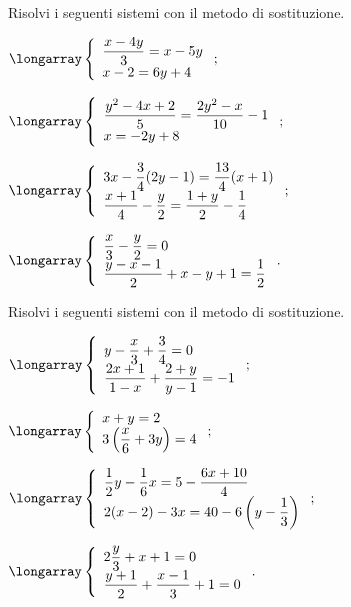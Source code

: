 \begin{esercizio}[\Ast]
 \label{ese:19.11}
Risolvi i seguenti sistemi con il metodo di sostituzione.
 \begin{multicols}{2}
 \begin{enumeratea}
 \item $\longarray\left\{\begin{array}{l}\dfrac{x-4y}{3}=x-5y\\x-2=6y+4 \end{array}\right.;$
\item $\longarray\left\{\begin{array}{l}\dfrac{y^{2}-4x+2}{5}=\dfrac{2y^{2}-x}{10}-1\\x=-2y+8\end{array}\right.;$
\item $\longarray\left\{\begin{array}{l}3x-\dfrac{3}{4}(2y-1)=\dfrac{13}{4}(x+1)\\\dfrac{x+1}{4}-\dfrac{y}{2}=\dfrac{1+y}{2}-\dfrac{1}{4}\end{array}\right.;$
\item $\longarray\left\{\begin{array}{l}\dfrac{x}{3}-\dfrac{y}{2}=0\\\dfrac{y-x-1}{2}+x-y+1=\dfrac{1}{2}\end{array}\right..$
 \end{enumeratea}
 \end{multicols}
\end{esercizio}

\begin{esercizio}[\Ast]
 \label{ese:19.12}
Risolvi i seguenti sistemi con il metodo di sostituzione.
 \begin{multicols}{2}
 \begin{enumeratea}
  \item $\longarray\left\{\begin{array}{l}y-\dfrac{x}{3}+\dfrac{3}{4}=0\\\dfrac{2x+1}{1-x}+\dfrac{2+y}{y-1}=-1\end{array}\right.;$
\item $\longarray\left\{\begin{array}{l}x+y=2\\3\left(\dfrac{x}{6}+3y\right)=4\end{array}\right.;$
\item $\longarray\left\{\begin{array}{l}\dfrac{1}{2}y-\dfrac{1}{6}x=5-\dfrac{6x+10}{4}\\2(x-2)-3x=40-6\left(y-\dfrac{1}{3}\right)\end{array}\right.;$
\item $\longarray\left\{\begin{array}{l}2\dfrac{y}{3}+x+1=0\\\dfrac{y+1}{2}+\dfrac{x-1}{3}+1=0\end{array}\right..$
 \end{enumeratea}
 \end{multicols}
\end{esercizio}


